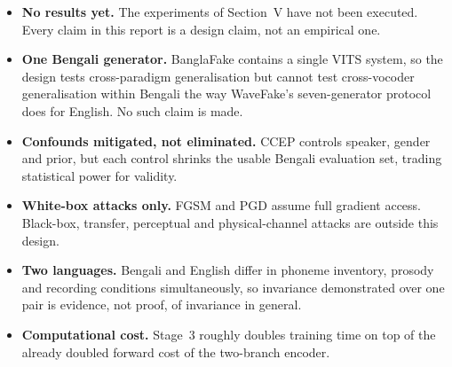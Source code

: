 \documentclass[conference]{IEEEtran}
\begin{document}
\begin{itemize}
\item \textbf{No results yet.} The experiments of Section~V have not been
      executed. Every claim in this report is a design claim, not an empirical
      one.
\item \textbf{One Bengali generator.} BanglaFake contains a single VITS
      system, so the design tests cross-paradigm generalisation but cannot
      test cross-vocoder generalisation within Bengali the way WaveFake's
      seven-generator protocol does for English. No such claim is made.
\item \textbf{Confounds mitigated, not eliminated.} CCEP controls speaker,
      gender and prior, but each control shrinks the usable Bengali evaluation
      set, trading statistical power for validity.
\item \textbf{White-box attacks only.} FGSM and PGD assume full gradient
      access. Black-box, transfer, perceptual and physical-channel attacks are
      outside this design.
\item \textbf{Two languages.} Bengali and English differ in phoneme inventory,
      prosody and recording conditions simultaneously, so invariance
      demonstrated over one pair is evidence, not proof, of invariance in
      general.
\item \textbf{Computational cost.} Stage~3 roughly doubles training time on
      top of the already doubled forward cost of the two-branch encoder.
\end{itemize}
\end{document}
